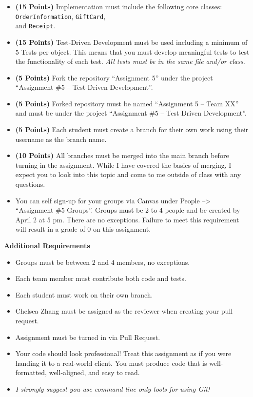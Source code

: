 \documentclass[paper=letter, fontsize=11pt]{scrartcl} %
\begin{document}
    \begin{itemize}[noitemsep]
        \item \textbf{(15 Points)} Implementation must include the following core classes: \texttt{OrderInformation}, \texttt{GiftCard}, \\ and \texttt{Receipt}.
        \item \textbf{(15 Points)} Test-Driven Development must be used including a minimum of 5 Tests per object. This means that you must develop meaningful tests to test the functionality of each test. \textit{All tests must be in the same file and/or class.}
        \item \textbf{(5 Points)} Fork the repository ``Assignment 5'' under the project ``Assignment \#5 -- Test-Driven Development''.
        \item \textbf{(5 Points)} Forked repository must be named ``Assignment 5 -- Team XX'' and must be under the project ``Assignment \#5 -- Test Driven Development''. 
        \item \textbf{(5 Points)} Each student must create a branch for their own work using their username as the branch name. 

        \item \textbf{(10 Points)} All branches must be merged into the main branch before turning in the assignment. While I have covered the basics of merging, I expect you to look into this topic and come to me outside of class with any questions.

        \item You can self sign-up for your groups via Canvas under People --> ``Assignment \#5 Groups''. Groups must be 2 to 4 people and be created by April 2 at 5 pm. There are no exceptions. Failure to meet this requirement will result in a grade of 0 on this assignment.
    \end{itemize}

    \textbf{Additional Requirements}
    \begin{itemize}[noitemsep]
        \item Groups must be between 2 and 4 members, no exceptions.
        \item Each team member must contribute both code and tests.
        \item Each student must work on their own branch.
        \item Chelsea Zhang must be assigned as the reviewer when creating your pull request.
        \item Assignment must be turned in via Pull Request.
        \item Your code should look professional! Treat this assignment as if you were handing it to a real-world client.  You must produce code that is well-formatted, well-aligned, and easy to read.
        \item \textit{I strongly suggest you use command line only tools for using Git!}
    \end{itemize}
\end{document}
